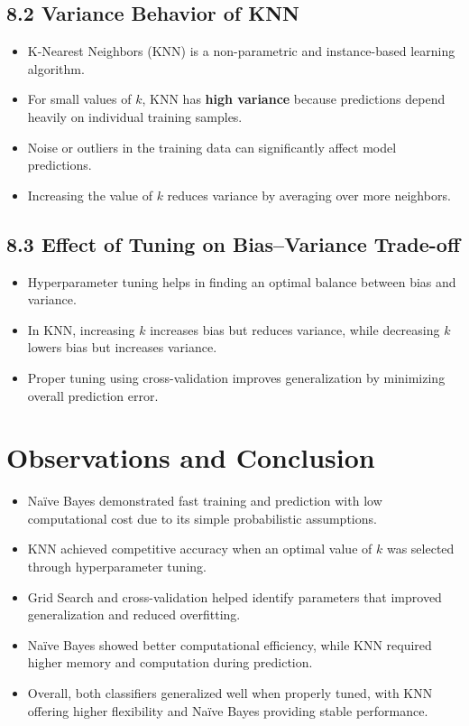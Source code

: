 \documentclass[11pt]{article}
\begin{document}
\subsection*{8.2 Variance Behavior of KNN}
\begin{itemize}
    \item K-Nearest Neighbors (KNN) is a non-parametric and instance-based learning algorithm.
    \item For small values of $k$, KNN has \textbf{high variance} because predictions depend heavily on individual training samples.
    \item Noise or outliers in the training data can significantly affect model predictions.
    \item Increasing the value of $k$ reduces variance by averaging over more neighbors.
\end{itemize}

\subsection*{8.3 Effect of Tuning on Bias--Variance Trade-off}
\begin{itemize}
    \item Hyperparameter tuning helps in finding an optimal balance between bias and variance.
    \item In KNN, increasing $k$ increases bias but reduces variance, while decreasing $k$ lowers bias but increases variance.
    \item Proper tuning using cross-validation improves generalization by minimizing overall prediction error.
\end{itemize}

\section{Observations and Conclusion}
\begin{itemize}
    \item Na\"ive Bayes demonstrated fast training and prediction with low computational cost due to its simple probabilistic assumptions.
    \item KNN achieved competitive accuracy when an optimal value of $k$ was selected through hyperparameter tuning.
    \item Grid Search and cross-validation helped identify parameters that improved generalization and reduced overfitting.
    \item Na\"ive Bayes showed better computational efficiency, while KNN required higher memory and computation during prediction.
    \item Overall, both classifiers generalized well when properly tuned, with KNN offering higher flexibility and Na\"ive Bayes providing stable performance.
\end{itemize}
\end{document}
